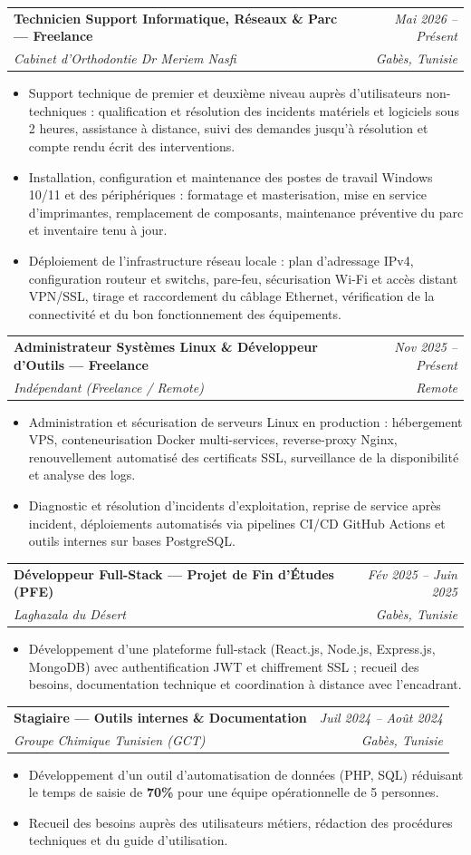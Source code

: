 \documentclass[letterpaper,9pt]{article}
\makeatletter
\newcommand{\resumeItem}[1]{\item\small{#1}}
\newcommand{\resumeSubheading}[4]{
  \vspace{-1pt}\item
  \begin{tabular*}{0.97\textwidth}[t]{l@{\extracolsep{\fill}}r}
    \textbf{#1} & \textit{\color{greytext}#2} \\
    \textit{\small\color{greytext} #3} & \textit{\small\color{greytext} #4}
  \end{tabular*}\vspace{-2pt}
}
\newcommand{\resumeItemListStart}{\begin{itemize}[leftmargin=0.24in, label={}, itemsep=0.9pt, topsep=1.2pt, parsep=0pt]}
\newcommand{\resumeItemListEnd}{\end{itemize}\vspace{-2pt}}
\makeatother
\begin{document}
  \resumeSubheading{Technicien Support Informatique, Réseaux \& Parc --- Freelance}{Mai 2026 -- Présent}{Cabinet d'Orthodontie Dr Meriem Nasfi}{Gabès, Tunisie}
    \resumeItemListStart
      \resumeItem{Support technique de premier et deuxième niveau auprès d'utilisateurs non-techniques : qualification et résolution des incidents matériels et logiciels sous 2 heures, assistance à distance, suivi des demandes jusqu'à résolution et compte rendu écrit des interventions.}
      \resumeItem{Installation, configuration et maintenance des postes de travail Windows 10/11 et des périphériques : formatage et masterisation, mise en service d'imprimantes, remplacement de composants, maintenance préventive du parc et inventaire tenu à jour.}
      \resumeItem{Déploiement de l'infrastructure réseau locale : plan d'adressage IPv4, configuration routeur et switchs, pare-feu, sécurisation Wi-Fi et accès distant VPN/SSL, tirage et raccordement du câblage Ethernet, vérification de la connectivité et du bon fonctionnement des équipements.}
    \resumeItemListEnd

  \resumeSubheading{Administrateur Systèmes Linux \& Développeur d'Outils --- Freelance}{Nov 2025 -- Présent}{Indépendant (Freelance / Remote)}{Remote}
    \resumeItemListStart
      \resumeItem{Administration et sécurisation de serveurs Linux en production : hébergement VPS, conteneurisation Docker multi-services, reverse-proxy Nginx, renouvellement automatisé des certificats SSL, surveillance de la disponibilité et analyse des logs.}
      \resumeItem{Diagnostic et résolution d'incidents d'exploitation, reprise de service après incident, déploiements automatisés via pipelines CI/CD GitHub Actions et outils internes sur bases PostgreSQL.}
    \resumeItemListEnd

  \resumeSubheading{Développeur Full-Stack --- Projet de Fin d'Études (PFE)}{Fév 2025 -- Juin 2025}{Laghazala du Désert}{Gabès, Tunisie}
    \resumeItemListStart
      \resumeItem{Développement d'une plateforme full-stack (React.js, Node.js, Express.js, MongoDB) avec authentification JWT et chif\hspace{0pt}frement SSL ; recueil des besoins, documentation technique et coordination à distance avec l'encadrant.}
    \resumeItemListEnd

  \resumeSubheading{Stagiaire --- Outils internes \& Documentation}{Juil 2024 -- Août 2024}{Groupe Chimique Tunisien (GCT)}{Gabès, Tunisie}
    \resumeItemListStart
      \resumeItem{Développement d'un outil d'automatisation de données (PHP, SQL) réduisant le temps de saisie de \textbf{70\%} pour une équipe opérationnelle de 5 personnes.}
      \resumeItem{Recueil des besoins auprès des utilisateurs métiers, rédaction des procédures techniques et du guide d'utilisation.}
    \resumeItemListEnd
\end{document}
